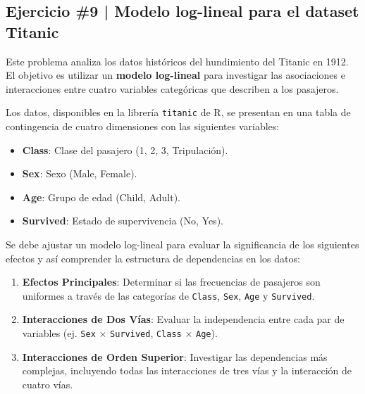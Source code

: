 \newpage

\begin{myblock}
\section*{Ejercicio \#9 | Modelo log-lineal para el dataset Titanic}

Este problema analiza los datos históricos del hundimiento del Titanic en 1912. El objetivo es utilizar un \textbf{modelo log-lineal} para investigar las asociaciones e interacciones entre cuatro variables categóricas que describen a los pasajeros.

Los datos, disponibles en la librería \texttt{titanic} de R, se presentan en una tabla de contingencia de cuatro dimensiones con las siguientes variables:
\begin{itemize}
    \item \textbf{Class}: Clase del pasajero (1, 2, 3, Tripulación).
    \item \textbf{Sex}: Sexo (Male, Female).
    \item \textbf{Age}: Grupo de edad (Child, Adult).
    \item \textbf{Survived}: Estado de supervivencia (No, Yes).
\end{itemize}

Se debe ajustar un modelo log-lineal para evaluar la significancia de los siguientes efectos y así comprender la estructura de dependencias en los datos:
\begin{enumerate}
    \item \textbf{Efectos Principales}: Determinar si las frecuencias de pasajeros son uniformes a través de las categorías de \texttt{Class}, \texttt{Sex}, \texttt{Age} y \texttt{Survived}.
    \item \textbf{Interacciones de Dos Vías}: Evaluar la independencia entre cada par de variables (ej. \texttt{Sex} $\times$ \texttt{Survived}, \texttt{Class} $\times$ \texttt{Age}).
    \item \textbf{Interacciones de Orden Superior}: Investigar las dependencias más complejas, incluyendo todas las interacciones de tres vías y la interacción de cuatro vías.
\end{enumerate}

\end{myblock}

